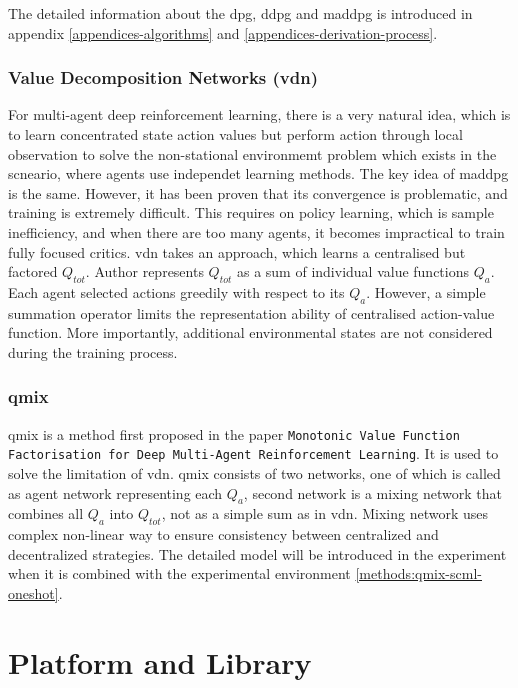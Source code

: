The detailed information about the \gls{dpg}, \gls{ddpg} and \gls{maddpg} is introduced in appendix \ref{appendices-algorithms} and \ref{appendices-derivation-process}.

\subsubsection{Value Decomposition Networks (\gls{vdn})}
For multi-agent deep reinforcement learning, there is a very natural idea, which is to learn concentrated state action values but perform action through local observation to solve the non-stational environmemt problem which exists in the scneario, where agents use independet learning methods. The key idea of \gls{maddpg} is the same. However, it has been proven that its convergence is problematic, and training is extremely difficult. This requires on policy learning, which is sample inefficiency, and when there are too many agents, it becomes impractical to train fully focused critics. \gls{vdn}\parencite{Sunehag2017} takes an approach, which learns a centralised but factored $Q_{tot}$. Author represents $Q_{tot}$ as a sum of individual value functions $Q_a$. Each agent selected actions greedily with respect to its $Q_a$. However, a simple summation operator limits the representation ability of centralised action-value function. More importantly, additional environmental states are not considered during the training process.

\subsubsection{\gls{qmix}}
\gls{qmix} is a method first proposed in the paper \texttt{Monotonic Value Function Factorisation for Deep Multi-Agent Reinforcement Learning}\parencite{Rashid2018}. It is used to solve the limitation of \gls{vdn}. \gls{qmix} consists of two networks, one of which is called as agent network representing each $Q_a$, second network is a mixing network that combines all $Q_a$ into $Q_{tot}$, not as a simple sum as in \gls{vdn}. Mixing network uses complex non-linear way to ensure consistency between centralized and decentralized strategies. The detailed model will be introduced in the experiment when it is combined with the experimental environment \ref{methods:qmix-scml-oneshot}.

\section{Platform and Library}
